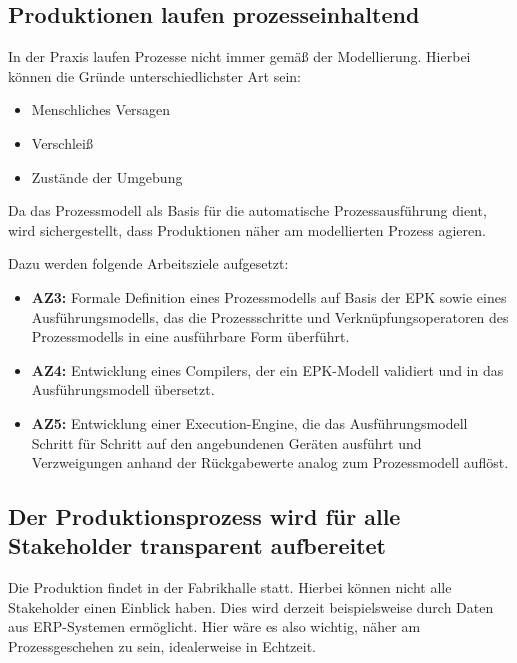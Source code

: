 \subsection{Produktionen laufen prozesseinhaltend}

In der Praxis laufen Prozesse nicht immer gemäß der Modellierung. Hierbei können die Gründe 
unterschiedlichster Art sein:

\begin{itemize}
  \item Menschliches Versagen
  \item Verschleiß
  \item Zustände der Umgebung
\end{itemize}

\noindent Da das Prozessmodell als Basis für die automatische Prozessausführung dient, wird 
sichergestellt, dass Produktionen näher am modellierten Prozess agieren.

\noindent Dazu werden folgende Arbeitsziele aufgesetzt:

\begin{itemize}
  \item \textbf{AZ3:} Formale Definition eines Prozessmodells auf Basis der EPK sowie eines 
  Ausführungsmodells, das die Prozessschritte und Verknüpfungsoperatoren des Prozessmodells in eine ausführbare 
  Form überführt.
  
  \item \textbf{AZ4:} Entwicklung eines Compilers, der ein EPK-Modell validiert und in das 
  Ausführungsmodell übersetzt.
  
  \item \textbf{AZ5:} Entwicklung einer Execution-Engine, die das Ausführungsmodell Schritt 
  für Schritt auf den angebundenen Geräten ausführt und Verzweigungen anhand der 
  Rückgabewerte analog zum Prozessmodell auflöst.
\end{itemize}

\subsection{Der Produktionsprozess wird für alle Stakeholder transparent aufbereitet}

Die Produktion findet in der Fabrikhalle statt. Hierbei können nicht alle Stakeholder einen 
Einblick haben. Dies wird derzeit beispielsweise durch Daten aus \ac{ERP}-Systemen ermöglicht. Hier 
wäre es also wichtig, näher am Prozessgeschehen zu sein, idealerweise in Echtzeit.

